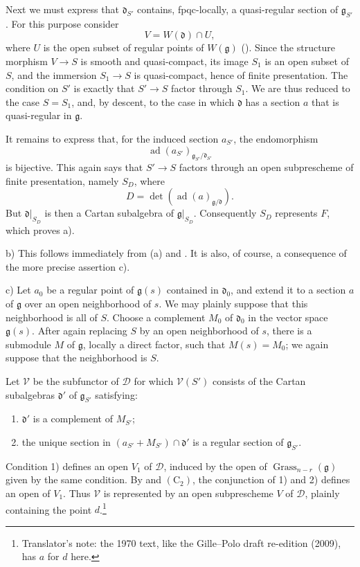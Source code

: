 Next we must express that \(\mathfrak d_{S'}\) contains,
fpqc-locally, a quasi-regular section of \(\mathfrak g_{S'}\). For
this purpose consider
\[
  V=W(\mathfrak d)\cap U,
\]
where \(U\) is the open subset of regular points of
\(W(\mathfrak g)\) \textup{()}. Since the structure morphism
\(V\to S\) is smooth and quasi-compact, its image \(S_1\) is an
open subset of \(S\), and the immersion \(S_1\to S\) is
quasi-compact, hence of finite presentation. The condition on
\(S'\) is exactly that \(S'\to S\) factor through \(S_1\). We are
thus reduced to the case \(S=S_1\), and, by descent, to the case in
which \(\mathfrak d\) has a section \(a\) that is quasi-regular in
\(\mathfrak g\).

It remains to express that, for the induced section \(a_{S'}\), the
endomorphism
\[
  \operatorname{ad}(a_{S'})
    _{\mathfrak g_{S'}/\mathfrak d_{S'}}
\]
is bijective. This again says that \(S'\to S\) factors through an
open subprescheme of finite presentation, namely \(S_D\), where
\[
  D=\det\!\left(
    \operatorname{ad}(a)_{\mathfrak g/\mathfrak d}
  \right).
\]
But \(\mathfrak d|_{S_D}\) is then a Cartan subalgebra of
\(\mathfrak g|_{S_D}\). Consequently \(S_D\) represents \(F\),
which proves \textup{a)}.

\medskip
\noindent\textup{b)}
This follows immediately from \textup{(a)} and . It is
also, of course, a consequence of the more precise assertion
\textup{c)}.

\medskip
\noindent\textup{c)}
Let \(a_0\) be a regular point of \(\mathfrak g(s)\) contained in
\(\mathfrak d_0\), and extend it to a section \(a\) of
\(\mathfrak g\) over an open neighborhood of \(s\). We may plainly
suppose that this neighborhood is all of \(S\). Choose a complement
\(M_0\) of \(\mathfrak d_0\) in the vector space
\(\mathfrak g(s)\). After again replacing \(S\) by an open
neighborhood of \(s\), there is a submodule \(M\) of
\(\mathfrak g\), locally a direct factor, such that
\(M(s)=M_0\); we again suppose that the neighborhood is \(S\).

Let \(\mathcal V\) be the subfunctor of \(\mathcal D\) for which
\(\mathcal V(S')\) consists of the Cartan subalgebras
\(\mathfrak d'\) of \(\mathfrak g_{S'}\) satisfying:
\begin{enumerate}
\item[\textup{1\textdegree)}]
  \(\mathfrak d'\) is a complement of \(M_{S'}\);
\item[\textup{2\textdegree)}]
  the unique section in
  \((a_{S'}+M_{S'})\cap\mathfrak d'\) is a regular section of
  \(\mathfrak g_{S'}\).
\end{enumerate}
Condition \textup{1\textdegree)} defines an open \(V_1\) of
\(\mathcal D\), induced by the open of
\(\operatorname{Grass}_{n-r}(\mathfrak g)\) given by the same
condition. By  and \((\mathrm C_2)\), the conjunction of
\textup{1\textdegree)} and \textup{2\textdegree)} defines an open
of \(V_1\). Thus \(\mathcal V\) is represented by an open
subprescheme \(V\) of \(\mathcal D\), plainly containing the point
\(d\).\footnote{Translator's note: the 1970 text, like the Gille--Polo draft re-edition (2009), has \(a\) for \(d\) here.}

